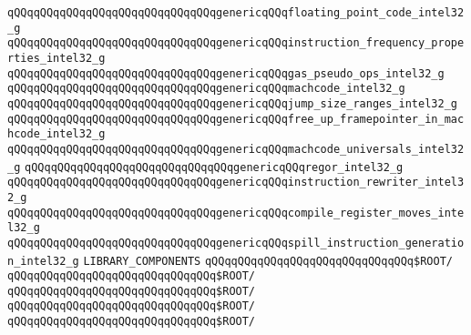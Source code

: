 \verb|qQQqqQQqqQQqqQQqqQQqqQQqqQQqqQQqgenericqQQqfloating_point_code_intel32_g|\newline
\verb|qQQqqQQqqQQqqQQqqQQqqQQqqQQqqQQqgenericqQQqinstruction_frequency_properties_intel32_g|\newline
\verb|qQQqqQQqqQQqqQQqqQQqqQQqqQQqqQQqgenericqQQqgas_pseudo_ops_intel32_g|\newline
\verb|qQQqqQQqqQQqqQQqqQQqqQQqqQQqqQQqgenericqQQqmachcode_intel32_g|\newline
\verb|qQQqqQQqqQQqqQQqqQQqqQQqqQQqqQQqgenericqQQqjump_size_ranges_intel32_g|\newline
\verb|qQQqqQQqqQQqqQQqqQQqqQQqqQQqqQQqgenericqQQqfree_up_framepointer_in_machcode_intel32_g|\newline
\verb|qQQqqQQqqQQqqQQqqQQqqQQqqQQqqQQqgenericqQQqmachcode_universals_intel32_g|\newline
\verb|qQQqqQQqqQQqqQQqqQQqqQQqqQQqqQQqgenericqQQqregor_intel32_g|\newline
\verb|qQQqqQQqqQQqqQQqqQQqqQQqqQQqqQQqgenericqQQqinstruction_rewriter_intel32_g|\newline
\verb|qQQqqQQqqQQqqQQqqQQqqQQqqQQqqQQqgenericqQQqcompile_register_moves_intel32_g|\newline
\verb|qQQqqQQqqQQqqQQqqQQqqQQqqQQqqQQqgenericqQQqspill_instruction_generation_intel32_g|\newline
\newline
\newline
\newline
\verb|LIBRARY_COMPONENTS|\newline
\newline
\verb|qQQqqQQqqQQqqQQqqQQqqQQqqQQqqQQq$ROOT/|\newline
\verb|qQQqqQQqqQQqqQQqqQQqqQQqqQQqqQQq$ROOT/|\newline
\newline
\verb|qQQqqQQqqQQqqQQqqQQqqQQqqQQqqQQq$ROOT/|\newline
\verb|qQQqqQQqqQQqqQQqqQQqqQQqqQQqqQQq$ROOT/|\newline
\verb|qQQqqQQqqQQqqQQqqQQqqQQqqQQqqQQq$ROOT/|\newline
